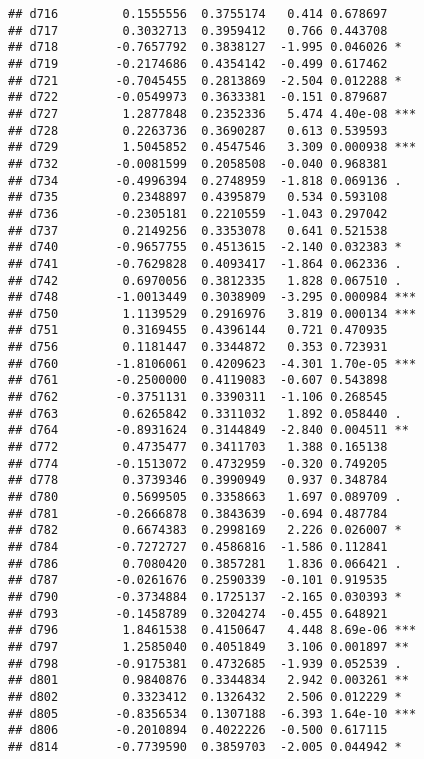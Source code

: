 \documentclass[
]{article}
\begin{document}
\begin{verbatim}
## d716         0.1555556  0.3755174   0.414 0.678697    
## d717         0.3032713  0.3959412   0.766 0.443708    
## d718        -0.7657792  0.3838127  -1.995 0.046026 *  
## d719        -0.2174686  0.4354142  -0.499 0.617462    
## d721        -0.7045455  0.2813869  -2.504 0.012288 *  
## d722        -0.0549973  0.3633381  -0.151 0.879687    
## d727         1.2877848  0.2352336   5.474 4.40e-08 ***
## d728         0.2263736  0.3690287   0.613 0.539593    
## d729         1.5045852  0.4547546   3.309 0.000938 ***
## d732        -0.0081599  0.2058508  -0.040 0.968381    
## d734        -0.4996394  0.2748959  -1.818 0.069136 .  
## d735         0.2348897  0.4395879   0.534 0.593108    
## d736        -0.2305181  0.2210559  -1.043 0.297042    
## d737         0.2149256  0.3353078   0.641 0.521538    
## d740        -0.9657755  0.4513615  -2.140 0.032383 *  
## d741        -0.7629828  0.4093417  -1.864 0.062336 .  
## d742         0.6970056  0.3812335   1.828 0.067510 .  
## d748        -1.0013449  0.3038909  -3.295 0.000984 ***
## d750         1.1139529  0.2916976   3.819 0.000134 ***
## d751         0.3169455  0.4396144   0.721 0.470935    
## d756         0.1181447  0.3344872   0.353 0.723931    
## d760        -1.8106061  0.4209623  -4.301 1.70e-05 ***
## d761        -0.2500000  0.4119083  -0.607 0.543898    
## d762        -0.3751131  0.3390311  -1.106 0.268545    
## d763         0.6265842  0.3311032   1.892 0.058440 .  
## d764        -0.8931624  0.3144849  -2.840 0.004511 ** 
## d772         0.4735477  0.3411703   1.388 0.165138    
## d774        -0.1513072  0.4732959  -0.320 0.749205    
## d778         0.3739346  0.3990949   0.937 0.348784    
## d780         0.5699505  0.3358663   1.697 0.089709 .  
## d781        -0.2666878  0.3843639  -0.694 0.487784    
## d782         0.6674383  0.2998169   2.226 0.026007 *  
## d784        -0.7272727  0.4586816  -1.586 0.112841    
## d786         0.7080420  0.3857281   1.836 0.066421 .  
## d787        -0.0261676  0.2590339  -0.101 0.919535    
## d790        -0.3734884  0.1725137  -2.165 0.030393 *  
## d793        -0.1458789  0.3204274  -0.455 0.648921    
## d796         1.8461538  0.4150647   4.448 8.69e-06 ***
## d797         1.2585040  0.4051849   3.106 0.001897 ** 
## d798        -0.9175381  0.4732685  -1.939 0.052539 .  
## d801         0.9840876  0.3344834   2.942 0.003261 ** 
## d802         0.3323412  0.1326432   2.506 0.012229 *  
## d805        -0.8356534  0.1307188  -6.393 1.64e-10 ***
## d806        -0.2010894  0.4022226  -0.500 0.617115    
## d814        -0.7739590  0.3859703  -2.005 0.044942 *  

\end{verbatim}
\end{document}
